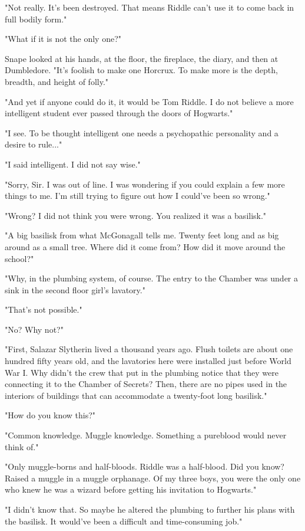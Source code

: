 \documentclass[a4paper,11pt]{article}
\begin{document}
"Not really. It's been destroyed. That means Riddle can't use it to come back in full bodily form."

"What if it is not the only one?"

Snape looked at his hands, at the floor, the fireplace, the diary, and then at Dumbledore. "It's foolish to make one Horcrux. To make more is the depth, breadth, and height of folly."

"And yet if anyone could do it, it would be Tom Riddle. I do not believe a more intelligent student ever passed through the doors of Hogwarts."

"I see. To be thought intelligent one needs a psychopathic personality and a desire to rule..."

"I said intelligent. I did not say wise."

"Sorry, Sir. I was out of line. I was wondering if you could explain a few more things to me. I'm still trying to figure out how I could've been so wrong."

"Wrong? I did not think you were wrong. You realized it was a basilisk."

"A big basilisk from what McGonagall tells me. Twenty feet long and as big around as a small tree. Where did it come from? How did it move around the school?"

"Why, in the plumbing system, of course. The entry to the Chamber was under a sink in the second floor girl's lavatory."

"That's not possible."

"No? Why not?"

"First, Salazar Slytherin lived a thousand years ago. Flush toilets are about one hundred fifty years old, and the lavatories here were installed just before World War I. Why didn't the crew that put in the plumbing notice that they were connecting it to the Chamber of Secrets? Then, there are no pipes used in the interiors of buildings that can accommodate a twenty-foot long basilisk."

"How do you know this?"

"Common knowledge. Muggle knowledge. Something a pureblood would never think of."

"Only muggle-borns and half-bloods. Riddle was a half-blood. Did you know? Raised a muggle in a muggle orphanage. Of my three boys, you were the only one who knew he was a wizard before getting his invitation to Hogwarts."

"I didn't know that. So maybe he altered the plumbing to further his plans with the basilisk. It would've been a difficult and time-consuming job."
\end{document}
